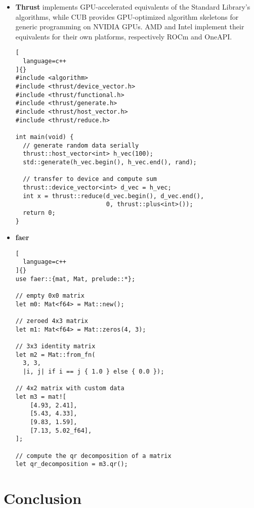 \documentclass[../main]{subfiles}
\begin{document}
\begin{itemize}
\begin{lstlisting}[
  language=c++
]{}
  hpx::future<std::uint64_t> n1 =
      hpx::async(fibonacci, n - 1);
  hpx::future<std::uint64_t> n2 =
      hpx::async(fibonacci, n - 2);

  // wait for the futures to return their values
  return n1.get() + n2.get();
}
\end{lstlisting}

\item
\textbf{Thrust} \cite{thrust} implements GPU-accelerated equivalents
of the Standard Library's algorithms, while CUB \cite{cub} provides
GPU-optimized algorithm skeletons for generic programming on NVIDIA GPUs.
AMD and Intel implement their equivalents for their own platforms, respectively
ROCm and OneAPI.

\begin{lstlisting}[
  language=c++
]{}
#include <algorithm>
#include <thrust/device_vector.h>
#include <thrust/functional.h>
#include <thrust/generate.h>
#include <thrust/host_vector.h>
#include <thrust/reduce.h>

int main(void) {
  // generate random data serially
  thrust::host_vector<int> h_vec(100);
  std::generate(h_vec.begin(), h_vec.end(), rand);

  // transfer to device and compute sum
  thrust::device_vector<int> d_vec = h_vec;
  int x = thrust::reduce(d_vec.begin(), d_vec.end(),
                         0, thrust::plus<int>());
  return 0;
}
\end{lstlisting}

\item
\textbf{faer} \cite{faer}

\begin{lstlisting}[
  language=c++
]{}
use faer::{mat, Mat, prelude::*};

// empty 0x0 matrix
let m0: Mat<f64> = Mat::new();

// zeroed 4x3 matrix
let m1: Mat<f64> = Mat::zeros(4, 3);

// 3x3 identity matrix
let m2 = Mat::from_fn(
  3, 3,
  |i, j| if i == j { 1.0 } else { 0.0 });

// 4x2 matrix with custom data
let m3 = mat![
    [4.93, 2.41],
    [5.43, 4.33],
    [9.83, 1.59],
    [7.13, 5.02_f64],
];

// compute the qr decomposition of a matrix
let qr_decomposition = m3.qr();
\end{lstlisting}

\end{itemize}

\section{
  Conclusion
}
\end{document}
